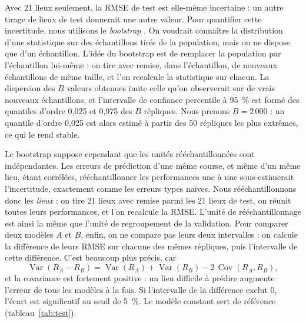\documentclass[11pt,a4paper]{article}
\DeclareMathOperator{\Var}{Var}
\DeclareMathOperator{\Cov}{Cov}
\begin{document}
Avec 21 lieux seulement, la RMSE de test est elle-même incertaine : un autre tirage de lieux de test donnerait une
autre valeur. Pour quantifier cette incertitude, nous utilisons le \emph{bootstrap} \citep{efron1979}. On voudrait
connaître la distribution d'une statistique sur des échantillons tirés de la population, mais on ne dispose que d'un
échantillon. L'idée du bootstrap est de remplacer la population par l'échantillon lui-même : on tire avec remise,
dans l'échantillon, de nouveaux échantillons de même taille, et l'on recalcule la statistique sur chacun. La
dispersion des $B$ valeurs obtenues imite celle qu'on observerait sur de vrais nouveaux échantillons, et
l'intervalle de confiance percentile à 95~\% est formé des quantiles d'ordre 0,025 et 0,975 des $B$ répliques. Nous
prenons $B = 2\,000$ : un quantile d'ordre 0,025 est alors estimé à partir des 50 répliques les plus extrêmes, ce qui
le rend stable.

Le bootstrap suppose cependant que les unités rééchantillonnées sont indépendantes. Les erreurs de prédiction d'une
même course, et même d'un même lieu, étant corrélées, rééchantillonner les performances une à une sous-estimerait
l'incertitude, exactement comme les erreurs types naïves. Nous rééchantillonnons donc les \emph{lieux} : on tire 21
lieux avec remise parmi les 21 lieux de test, on réunit toutes leurs performances, et l'on recalcule la RMSE. L'unité
de rééchantillonnage est ainsi la même que l'unité de regroupement de la validation. Pour comparer deux modèles $A$
et $B$, enfin, on ne compare pas leurs deux intervalles : on calcule la différence de leurs RMSE sur chacune des
mêmes répliques, puis l'intervalle de cette différence. C'est beaucoup plus précis, car
\[
\Var(R_A - R_B) = \Var(R_A) + \Var(R_B) - 2\,\Cov(R_A, R_B),
\]
et la covariance est fortement positive : un lieu difficile à prédire augmente l'erreur de tous les modèles à la fois.
Si l'intervalle de la différence exclut 0, l'écart est significatif au seuil de 5~\%. Le modèle constant sert de
référence (tableau~\ref{tab:test}).
\end{document}
